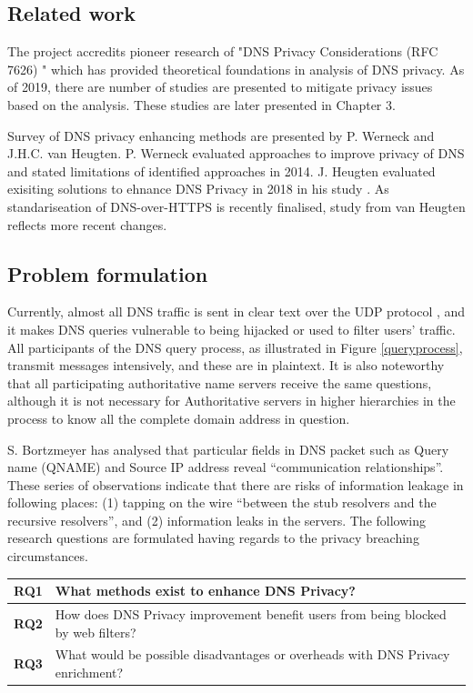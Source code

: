 \documentclass[a4paper,12pt]{article}
\begin{document}
\subsection{Related work}
The project accredits pioneer research of "DNS Privacy Considerations (RFC 7626) \cite{rfc7626}" which has provided theoretical foundations in analysis of DNS privacy. 
As of 2019, there are number of studies are presented to mitigate privacy issues based on the analysis. These studies are later presented in Chapter 3.

Survey of DNS privacy enhancing methods are presented by P. Werneck and J.H.C. van Heugten. P. Werneck evaluated approaches to improve privacy of DNS and stated limitations of identified approaches\cite{werneck2014dns} in 2014. J. Heugten evaluated exisiting solutions to ehnance DNS Privacy in 2018 in his study \cite{van2018privacy}. As standariseation of DNS-over-HTTPS is recently finalised\cite{rfc8484}, study from van Heugten reflects more recent changes.

\subsection{Problem formulation}
Currently, almost all DNS traffic is sent in clear text \cite{rfc7626} over the UDP protocol \cite{tcp2014analysis}, and it makes DNS queries vulnerable to being hijacked or used to filter users' traffic.
All participants of the DNS query process, as illustrated in Figure \ref{queryprocess}, transmit messages intensively, and these are in plaintext.
It is also noteworthy that all participating authoritative name servers receive the same questions, although it is not necessary for Authoritative servers in higher hierarchies in the process to know all the complete domain address in question.

S. Bortzmeyer has analysed that particular fields in DNS packet\cite{rfc1035} such as Query name (QNAME) and Source IP address reveal ``communication relationships\cite{rfc7626}''.
These series of observations indicate that there are risks of information leakage in following places: (1) tapping on the wire ``between the stub resolvers and the recursive resolvers'', and (2) information leaks in the servers.
The following research questions are formulated having regards to the privacy breaching circumstances.

\begin{table}[h!]
    \begin{tabular} {|p{1.2cm}|p{12.8cm}|} \hline
        \textbf{RQ1} & What methods exist to enhance DNS Privacy? \\ \hline
        \textbf{RQ2} & How does DNS Privacy improvement benefit users from being blocked by web filters?\\ \hline
        \textbf{RQ3} & What would be possible disadvantages or overheads with DNS Privacy enrichment? \\ \hline
    \end{tabular}
\end{table}
\end{document}
